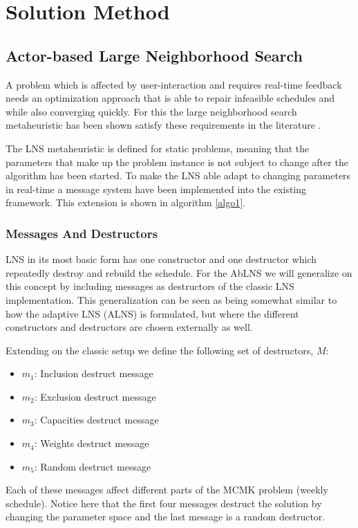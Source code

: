 \documentclass[preprint,12pt,authoryear]{elsarticle}
\begin{document}
\section{Solution Method}
\label{sec:2-solution-method}

\subsection{Actor-based Large Neighborhood Search}
A problem which is affected by user-interaction and requires real-time feedback needs an optimization approach that is able to repair infeasible schedules and while also 
converging quickly. For this the large neighborhood search metaheuristic has been shown satisfy these requirements in the literature \cite{gendreau_handbook_2019}. 

The LNS metaheuristic is defined for static problems, meaning that the parameters that make up the problem instance is not subject to change 
after the algorithm has been started. To make the LNS able adapt to changing parameters in real-time a message system have been implemented into the existing framework. This 
extension is shown in algorithm \ref{algo1}.  

\subsubsection{Messages And Destructors}
LNS in its most basic form has one constructor and one destructor which repeatedly destroy and rebuild the schedule. For the AbLNS we will generalize on this concept by 
including messages as destructors of the classic LNS implementation. This generalization can be seen as being somewhat similar to how the adaptive LNS (ALNS) is formulated,
but where the different constructors and destructors are chosen externally as well. 

Extending on the classic setup we define the following set of destructors, $M$:

\begin{itemize}
	\item $m_1$: Inclusion destruct message	
	\item $m_2$: Exclusion destruct message	
	\item $m_3$: Capacities destruct message	
	\item $m_4$: Weights destruct message	
	\item $m_5$: Random destruct message
\end{itemize}

Each of these messages affect different parts of the MCMK problem (weekly schedule). Notice
here that the first four messages destruct the solution by changing the parameter space and the last message is 
a random destructor.
\end{document}
